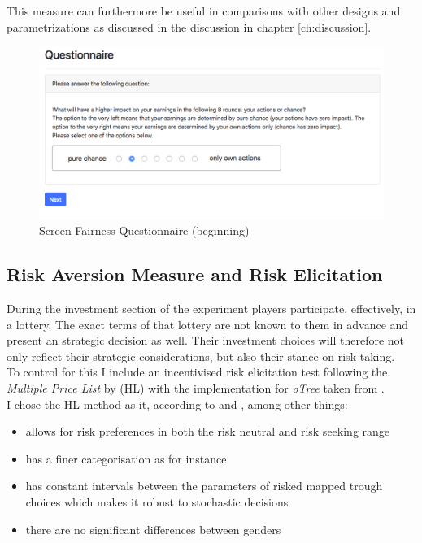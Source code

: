     This measure can furthermore be useful in comparisons with other designs and parametrizations as discussed in the discussion in chapter \ref{ch:discussion}.
    
    \begin{figure}
        \centering
        \includegraphics[width=\textwidth]{graphs/Fairness_Q_Begin.png}
        \caption{Screen Fairness Questionnaire (beginning)}
        \label{fig:fair_q}
    \end{figure}
    
        
    \subsection{Risk Aversion Measure and Risk Elicitation}
    
    During the investment section of the experiment players participate, effectively, in a lottery. The exact terms of that lottery are not known to them in advance and present an strategic decision as well. Their investment choices will therefore not only reflect their strategic considerations, but also their stance on risk taking.\\
    
    To control for this I include an incentivised risk elicitation test following the \textit{Multiple Price List} by \cite{holt2002} (HL) with the implementation for \textit{oTree} taken from \cite{holzmeister2017}.\\
    
    I chose the HL method as it, according to \cite{crosetto2016} and \cite{harrison2008}, among other things:
    \begin{itemize}
        \item allows for risk preferences in both the risk neutral and risk seeking range
        \item has a finer categorisation as for instance \cite{eckel2008}
        \item has constant intervals between the parameters of risked mapped trough choices which makes it robust to stochastic decisions
        \item there are no significant differences between genders
    \end{itemize}  
       
